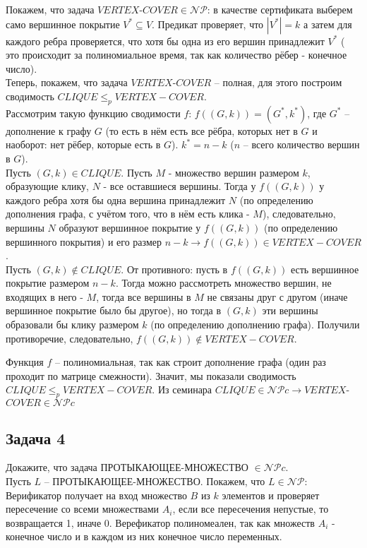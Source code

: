 \documentclass[a4paper,12pt]{article} %
\begin{document}
Покажем, что задача $VERTEX$-$COVER \in \mathcal{NP}$: в качестве сертификата выберем само вершинное покрытие $ V^* \subseteq V$. Предикат проверяет, что $ |V^*| = k $ а затем для каждого ребра проверяется, что хотя бы одна из его вершин принадлежит $ V^* $ ( это происходит за полиномиальное время, так как количество рёбер - конечное число).\\

Теперь, покажем, что задача $VERTEX$-$COVER$ -- полная, для этого построим сводимость  $CLIQUE \leq_p VERTEX-COVER$.\\
Рассмотрим такую функцию сводимости $ f $: $f((G, k)) = (G^*, k^*)$, где $ G^* $ -- дополнение к графу $ G $ (то есть в нём есть все рёбра, которых нет в $ G $ и наоборот: нет рёбер, которые есть в $ G $). $ k^* = n - k$ ($ n $ -- всего количество вершин в $ G $).\\

Пусть $(G, k) \in CLIQUE$. Пусть $ M $ - множество вершин размером $ k $, образующие клику, $ N $ - все оставшиеся вершины. Тогда у $ f((G, k)) $ у каждого ребра хотя бы одна вершина принадлежит $ N $ (по определению дополнения графа, с учётом того, что в нём есть клика - $ M $), следовательно, вершины $ N $ образуют вершинное покрытие у $ f((G, k)) $ (по определению вершинного покрытия) и его размер $ n-k \longrightarrow f((G, k)) \in VERTEX-COVER$.\\


Пусть $(G, k) \notin CLIQUE$. От противного: пусть в $ f((G, k)) $ есть вершинное покрытие размером $ n-k $. Тогда можно рассмотреть множество вершин, не входящих в него - $ M $, тогда все вершины в $ M $ не связаны друг с другом (иначе вершинное покрытие было бы другое), но тогда в $ (G,k) $ эти вершины образовали бы клику размером $ k $ (по определению дополнению графа). Получили противоречие, следовательно, $f((G, k)) \notin VERTEX-COVER$.

Функция $ f $ -- полиномиальная, так как строит дополнение графа (один раз проходит по матрице смежности). Значит, мы показали сводимость $CLIQUE \leq_p VERTEX-COVER$. Из семинара $CLIQUE \in \mathcal{NP}c \longrightarrow VERTEX$-$COVER \in \mathcal{NP}c$


\subsection*{Задача 4}
Докажите, что задача ПРОТЫКАЮЩЕЕ-МНОЖЕСТВО $\in \mathcal{NP}c$. \\

Пусть $ L $ -- ПРОТЫКАЮЩЕЕ-МНОЖЕСТВО. Покажем, что $ L \in \mathcal{NP}$:\\
Верификатор получает на вход множество $ B $ из $ k $ элементов и проверяет пересечение со всеми множествами $ A_i $, если все пересечения непустые, то возвращается 1, иначе 0. Верефикатор полиномеален, так как множеств $ A_i $ - конечное число и в каждом из них конечное число переменных.\\
\end{document}
